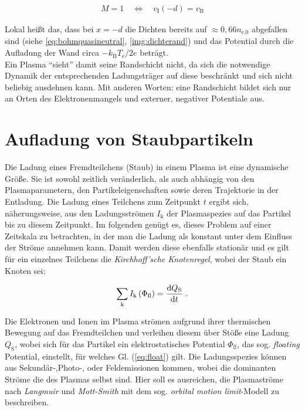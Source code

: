 \documentclass[numbers=noenddot,a4paper,notitlepage,twoside,BCOR15mm]{scrbook}
\newcommand{\diff}{\textnormal{d}}
\newcommand{\ix}[1]{_\text{#1}}
\newcommand{\tilt}[1]{\textit{#1}}
\begin{document}
				\begin{align}
					M=1 \quad \Leftrightarrow \quad v\ix{I}\left(-d\right)=v\ix{B} \label{eq:bohmkritzwei}
				\end{align}

			Lokal heißt das, dass bei $x=-d$ die Dichten bereits auf $\approx0,66n\ix{e,0}$ abgefallen sind (siehe \ref{eq:bohmquasineutral}, \ref{img:dichterand}) und das Potential durch die Aufladung der Wand circa $-k\ix{B}T\ix{e}/2e$ beträgt.\\
			Ein Plasma "`sieht"' damit seine Randschicht nicht, da sich die notwendige Dynamik der entsprechenden Ladungsträger auf diese beschränkt und sich nicht beliebig ausdehnen kann. Mit anderen Worten: eine Randschicht bildet sich nur an Orten des Elektronenmangels und externer, negativer Potentiale aus.

		\section{Aufladung von Staubpartikeln}\label{sub:ströme}

			Die Ladung eines Fremdteilchens (Staub) in einem Plasma ist eine dynamische Größe. Sie ist sowohl zeitlich veränderlich, als auch abhängig von den Plasmaparametern, den Partikeleigenschaften sowie deren Trajektorie in der Entladung. Die Ladung eines Teilchens zum Zeitpunkt $t$ ergibt sich, näherungsweise, aus den Ladungsströmen $I\ix{k}$ der Plasmaspezies auf das Partikel bis zu diesem Zeitpunkt. Im folgenden genügt es, dieses Problem auf einer Zeitskala zu betrachten, in der man die Ladung als konstant unter dem Einfluss der Ströme annehmen kann. Damit werden diese ebenfalls stationär und es gilt für ein einzelnes Teilchens die \tilt{Kirchhoff'sche Knotenregel}, wobei der Staub ein Knoten sei:

				\begin{align}
					\sum_{\text{k}} I\ix{k}\left(\Phi\ix{fl}\right)=\frac{\diff Q\ix{S}}{\diff t} \,\, . \label{eq:float}
				\end{align}

		Die Elektronen und Ionen im Plasma strömen aufgrund ihrer thermischen Bewegung auf das Fremdteilchen und verleihen diesem über Stöße eine Ladung $Q\ix{S}$, wobei sich für das Partikel ein elektrostatisches Potential $\Phi\ix{fl}$, das sog. \tilt{floating} Potential, einstellt, für welches Gl. (\ref{eq:float}) gilt. Die Ladungsspezies können aus Sekundär-,Photo-, oder Feldemissionen kommen, wobei die dominanten Ströme die des Plasmas selbst sind. Hier soll es ausreichen, die Plasmaströme nach  \tilt{Langmuir} und \tilt{Mott-Smith} mit dem sog. \tilt{orbital motion limit}-Modell \cite{Langmuir26} zu beschreiben. 
\end{document}
